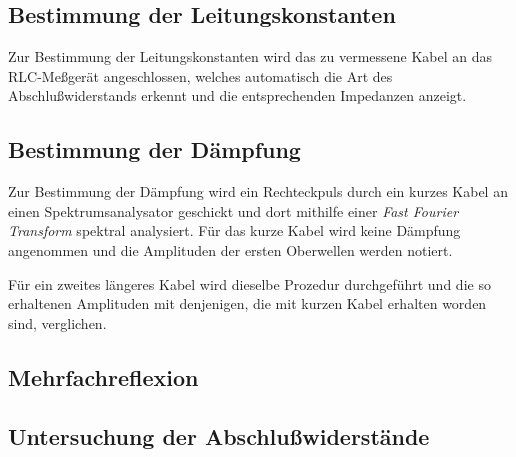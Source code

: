 \subsection{Bestimmung der Leitungskonstanten}

Zur Bestimmung der Leitungskonstanten wird das zu vermessene Kabel an
das RLC-Meßgerät angeschlossen, welches automatisch die Art des
Abschlußwiderstands erkennt und die entsprechenden Impedanzen anzeigt.

\subsection{Bestimmung der Dämpfung}

Zur Bestimmung der Dämpfung wird ein Rechteckpuls durch ein kurzes Kabel
an einen Spektrumsanalysator geschickt und dort mithilfe
einer \textit{Fast Fourier Transform} spektral analysiert.  Für das
kurze Kabel wird keine Dämpfung angenommen und die Amplituden der ersten
Oberwellen werden notiert.

Für ein zweites längeres Kabel wird dieselbe Prozedur durchgeführt und
die so erhaltenen Amplituden mit denjenigen, die mit kurzen Kabel
erhalten worden sind, verglichen.

\subsection{Mehrfachreflexion}

\subsection{Untersuchung der Abschlußwiderstände}




